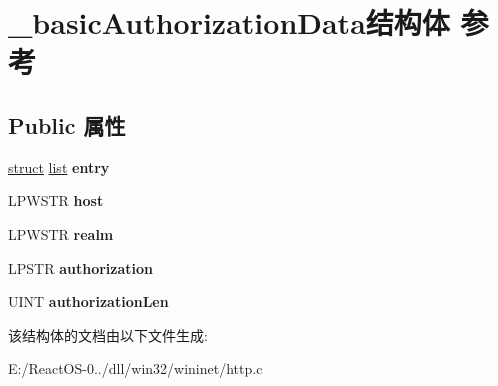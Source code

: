 \hypertarget{struct__basic_authorization_data}{}\section{\+\_\+basic\+Authorization\+Data结构体 参考}
\label{struct__basic_authorization_data}
\subsection*{Public 属性}
\begin{DoxyCompactItemize}
\item 
\mbox{\label{struct__basic_authorization_data_a44cd6e4fda9f75838a779b774f1b0d7f}} 
\hyperlink{interfacestruct}{struct} \hyperlink{classlist}{list} {\bfseries entry}
\item 
\mbox{\label{struct__basic_authorization_data_aeb4796401838927eab0dea41a2ddcc4c}} 
L\+P\+W\+S\+TR {\bfseries host}
\item 
\mbox{\label{struct__basic_authorization_data_a0b431c5a0574266360eae0205d2f67cb}} 
L\+P\+W\+S\+TR {\bfseries realm}
\item 
\mbox{\label{struct__basic_authorization_data_ae9156a00de41049b6ae95ce039950877}} 
L\+P\+S\+TR {\bfseries authorization}
\item 
\mbox{\label{struct__basic_authorization_data_a341f9955acefdc7208587322c312ec50}} 
U\+I\+NT {\bfseries authorization\+Len}
\end{DoxyCompactItemize}


该结构体的文档由以下文件生成\+:\begin{DoxyCompactItemize}
\item 
E\+:/\+React\+O\+S-\/0../dll/win32/wininet/http.\+c\end{DoxyCompactItemize}
